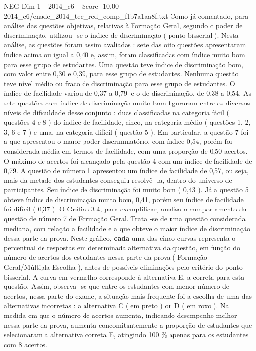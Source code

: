 \begin{textsample}{NEG Dim 1 – 2014\_c6 – Score -10.00 – 2014\_c6/enade\_2014\_tec\_red\_comp\_f1b7a1aa8f.txt}
Como já comentado, para análise das questões objetivas, relativas à Formação Geral, segundo o poder de discriminação, utilizou -se o índice de discriminação ( ponto bisserial ).
Nesta análise, as questões foram assim avaliadas : sete das oito questões apresentaram índice acima ou igual a 0,40 e, assim, foram classificadas com índice muito bom para esse grupo de estudantes.
Uma questão teve índice de discriminação bom, com valor entre 0,30 e 0,39, para esse grupo de estudantes.
Nenhuma questão teve nível médio ou fraco de discriminação para esse grupo de estudantes.
O índice de facilidade variou de 0,37 a 0,79, e o de discriminação, de 0,38 a 0,54.
As sete questões com índice de discriminação muito bom figuraram entre os diversos níveis de dificuldade desse conjunto : duas classificadas na categoria fácil ( questões 4 e 8 ) do índice de facilidade, cinco, na categoria médio ( questões 1, 2, 3, 6 e 7 ) e uma, na categoria difícil ( questão 5 ).
Em particular, a questão 7 foi a que apresentou o maior poder discriminatório, com índice 0,54, porém foi considerada média em termos de facilidade, com uma proporção de 0,50 acertos.
O máximo de acertos foi alcançado pela questão 4 com um índice de facilidade de 0,79.
A questão de número 1 apresentou um índice de facilidade de 0,57, ou seja, mais da metade dos estudantes conseguiu resolvê -la, dentro do universo de participantes.
Seu índice de discriminação foi muito bom ( 0,43 ).
Já a questão 5 obteve índice de discriminação muito bom, 0,41, porém seu índice de facilidade foi difícil ( 0,37 ).
O Gráfico 3.4, para exemplificar, analisa o comportamento da questão de número 7 de Formação Geral.
Trata -se de uma questão considerada mediana, com relação a facilidade e a que obteve o maior índice de discriminação dessa parte da prova.
Neste gráfico, \textbf{cada} uma das cinco curvas representa o percentual de respostas em determinada alternativa da questão, em função do número de acertos dos estudantes nessa parte da prova ( Formação Geral/Múltipla Escolha ), antes de possíveis eliminações pelo critério do ponto bisserial.
A curva em vermelho corresponde à alternativa E, a correta para esta questão.
Assim, observa -se que entre os estudantes com menor número de acertos, nessa parte do exame, a situação mais frequente foi a escolha de uma das alternativas incorretas : a alternativa C ( em preto ) ou D ( em roxo ).
Na medida em que o número de acertos aumenta, indicando desempenho melhor nessa parte da prova, aumenta concomitantemente a proporção de estudantes que selecionaram a alternativa correta E, atingindo 100 \% apenas para os estudantes com 8 acertos.

\end{textsample}
